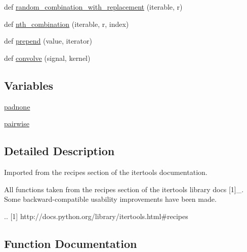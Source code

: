 \begin{DoxyCompactItemize}
\item 
def \hyperlink{namespacesetuptools_1_1__vendor_1_1more__itertools_1_1recipes_aeafdb5ebe9596518b965a9d92f873a00}{random\+\_\+combination\+\_\+with\+\_\+replacement} (iterable, r)
\item 
def \hyperlink{namespacesetuptools_1_1__vendor_1_1more__itertools_1_1recipes_a1cf712ce53166cc883ad2f06d696044e}{nth\+\_\+combination} (iterable, r, index)
\item 
def \hyperlink{namespacesetuptools_1_1__vendor_1_1more__itertools_1_1recipes_ae8cf65858b8186301e2b05fd1033f2a6}{prepend} (value, iterator)
\item 
def \hyperlink{namespacesetuptools_1_1__vendor_1_1more__itertools_1_1recipes_a2dac2c2abcf911c2d3c2a0629c153d92}{convolve} (signal, kernel)
\end{DoxyCompactItemize}
\subsection*{Variables}
\begin{DoxyCompactItemize}
\item 
\hyperlink{namespacesetuptools_1_1__vendor_1_1more__itertools_1_1recipes_a4c05b748d0dba58e28b5819e850ad5b8}{padnone}
\item 
\hyperlink{namespacesetuptools_1_1__vendor_1_1more__itertools_1_1recipes_a9cd7dddf054cda2e2f24203685040f06}{pairwise}
\end{DoxyCompactItemize}


\subsection{Detailed Description}
\begin{DoxyVerb}Imported from the recipes section of the itertools documentation.

All functions taken from the recipes section of the itertools library docs
[1]_.
Some backward-compatible usability improvements have been made.

.. [1] http://docs.python.org/library/itertools.html#recipes\end{DoxyVerb}
 

\subsection{Function Documentation}
\mbox{\label{namespacesetuptools_1_1__vendor_1_1more__itertools_1_1recipes_a4a6dab112c110bf2e518b72e523632f2}} 
